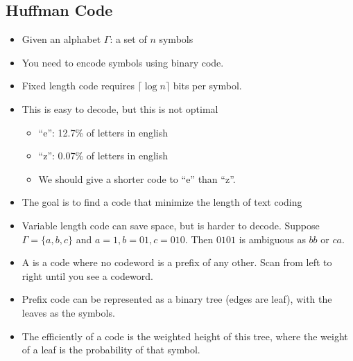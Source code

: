 \documentclass[a4paper,12pt]{article}
\begin{document}
\subsection{Huffman Code}
\begin{itemize}
    \item Given an alphabet $\Gamma$: a set of $n$ symbols
    \item You need to encode symbols using binary code. 
    \item Fixed length code requires $\lceil\log n\rceil$ bits per symbol.
    \item This is easy to decode, but this is not optimal
    \begin{itemize}
        \item ``e'': 12.7\% of letters in english
        \item ``z'': 0.07\% of letters in english
        \item We should give a shorter code to ``e'' than ``z''.
    \end{itemize}
    \item The goal is to find a code that minimize the length of text coding
    \item Variable length code can save space, but is harder to decode. Suppose $\Gamma=\{a,b,c\}$ and $a=1,b=01,c=010$. Then $0101$ is ambiguous as $bb$ or $ca$.
    \item A  is a code where no codeword is a prefix of any other. Scan from left to right until you see a codeword.
    \item Prefix code can be represented as a binary tree (edges are leaf), with the leaves as the symbols.
    \item The efficiently of a code is the weighted height of this tree, where the weight of a leaf is the probability of that symbol.
\end{itemize}
\end{document}
